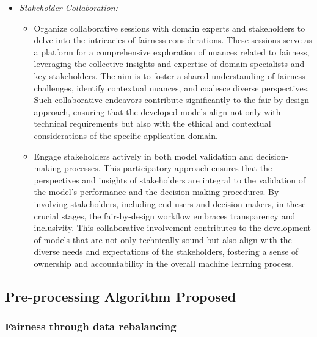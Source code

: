 \begin{itemize}
    
    \item \emph{Stakeholder Collaboration:}
    
    \begin{itemize}
    
        \item Organize collaborative sessions with domain experts and stakeholders to delve into the intricacies of fairness considerations. These sessions serve as a platform for a comprehensive exploration of nuances related to fairness, leveraging the collective insights and expertise of domain specialists and key stakeholders. The aim is to foster a shared understanding of fairness challenges, identify contextual nuances, and coalesce diverse perspectives. Such collaborative endeavors contribute significantly to the fair-by-design approach, ensuring that the developed models align not only with technical requirements but also with the ethical and contextual considerations of the specific application domain.
    
        
        \item Engage stakeholders actively in both model validation and decision-making processes. This participatory approach ensures that the perspectives and insights of stakeholders are integral to the validation of the model's performance and the decision-making procedures. By involving stakeholders, including end-users and decision-makers, in these crucial stages, the fair-by-design workflow embraces transparency and inclusivity. This collaborative involvement contributes to the development of models that are not only technically sound but also align with the diverse needs and expectations of the stakeholders, fostering a sense of ownership and accountability in the overall machine learning process.
    
    \end{itemize}

\end{itemize}

\subsection{Pre-processing Algorithm Proposed}

\subsubsection{Fairness through data rebalancing}
\label{subsec:ftdr}

